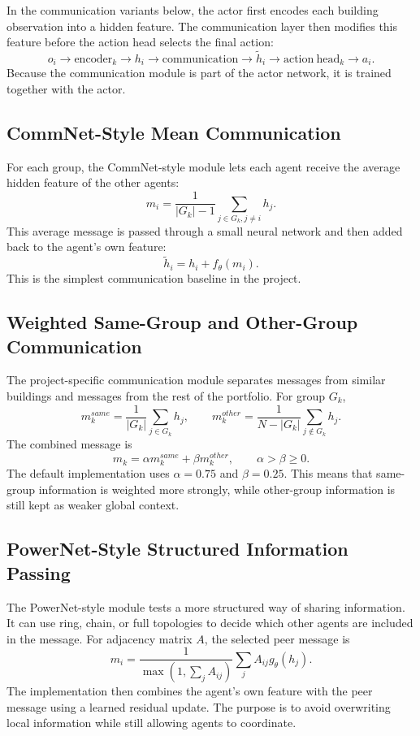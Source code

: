 \begin{itemize}
In the communication variants below, the actor first encodes each building
observation into a hidden feature. The communication layer then modifies this
feature before the action head selects the final action:
\[
o_i \rightarrow \mathrm{encoder}_k \rightarrow h_i
\rightarrow \mathrm{communication} \rightarrow \tilde{h}_i
\rightarrow \mathrm{action\ head}_k \rightarrow a_i .
\]
Because the communication module is part of the actor network, it is trained
together with the actor.

\subsection{CommNet-Style Mean Communication}

For each group, the CommNet-style module lets each agent receive the average
hidden feature of the other agents:
\[
m_i = \frac{1}{|G_k|-1}\sum_{j \in G_k, j \ne i} h_j .
\]
This average message is passed through a small neural network and then added
back to the agent's own feature:
\[
\tilde{h}_i = h_i + f_\theta(m_i).
\]
This is the simplest communication baseline in the project.

\subsection{Weighted Same-Group and Other-Group Communication}

The project-specific communication module separates messages from similar
buildings and messages from the rest of the portfolio. For group $G_k$,
\[
m^{same}_k = \frac{1}{|G_k|}\sum_{j \in G_k} h_j,
\qquad
m^{other}_k = \frac{1}{N-|G_k|}\sum_{j \notin G_k} h_j .
\]
The combined message is
\[
m_k = \alpha m^{same}_k + \beta m^{other}_k,
\qquad \alpha > \beta \geq 0.
\]
The default implementation uses $\alpha=0.75$ and $\beta=0.25$. This means that
same-group information is weighted more strongly, while other-group information
is still kept as weaker global context.

\subsection{PowerNet-Style Structured Information Passing}

The PowerNet-style module tests a more structured way of sharing information. It
can use ring, chain, or full topologies to decide which other agents are included
in the message. For adjacency matrix $A$, the selected peer message is
\[
m_i = \frac{1}{\max(1,\sum_j A_{ij})}\sum_j A_{ij}g_\theta(h_j).
\]
The implementation then combines the agent's own feature with the peer message
using a learned residual update. The purpose is to avoid overwriting local
information while still allowing agents to coordinate.


\end{itemize}
